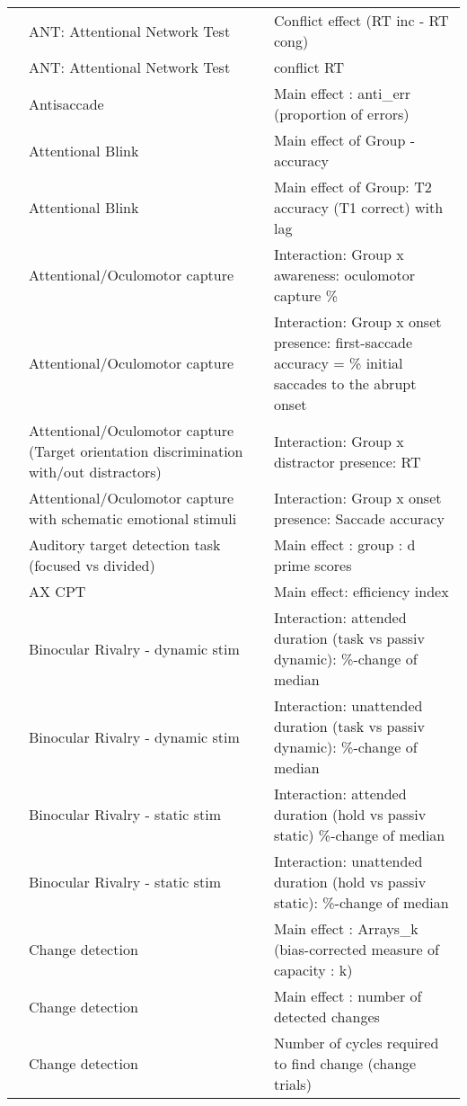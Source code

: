 \documentclass[
]{book}
\begin{document}
\begin{tabular}{l|l|l}
\cline{1-3}
 & ANT: Attentional Network Test & Conflict effect (RT inc - RT cong)\\
\cline{2-3}
 & ANT: Attentional Network Test & conflict RT\\
\cline{2-3}
 & Antisaccade & Main effect : anti\_err (proportion of errors)\\
\cline{2-3}
 & Attentional Blink & Main effect of Group - accuracy\\
\cline{2-3}
 & Attentional Blink & Main effect of Group:  T2 accuracy (T1 correct) with lag\\
\cline{2-3}
 & Attentional/Oculomotor capture & Interaction: Group x awareness: oculomotor capture \%\\
\cline{2-3}
 & Attentional/Oculomotor capture & Interaction: Group x onset presence: first-saccade accuracy = \% initial saccades to the abrupt onset\\
\cline{2-3}
 & Attentional/Oculomotor capture (Target orientation discrimination with/out distractors) & Interaction: Group x distractor presence: RT\\
\cline{2-3}
 & Attentional/Oculomotor capture with schematic emotional stimuli & Interaction: Group x onset presence: Saccade accuracy\\
\cline{2-3}
 & Auditory target detection task (focused vs divided) & Main effect : group : d prime scores\\
\cline{2-3}
 & AX CPT & Main effect: efficiency index\\
\cline{2-3}
 & Binocular Rivalry - dynamic stim & Interaction: attended duration (task vs passiv dynamic): \%-change of median\\
\cline{2-3}
 & Binocular Rivalry - dynamic stim & Interaction: unattended duration (task vs passiv dynamic): \%-change of median\\
\cline{2-3}
 & Binocular Rivalry - static stim & Interaction: attended duration (hold vs passiv static) \%-change of median\\
\cline{2-3}
 & Binocular Rivalry - static stim & Interaction: unattended duration (hold vs passiv static): \%-change of median\\
\cline{2-3}
 & Change detection & Main effect : Arrays\_k (bias-corrected measure of capacity : k)\\
\cline{2-3}
 & Change detection & Main effect : number of detected changes\\
\cline{2-3}
 & Change detection & Number of cycles required to find change (change trials)\\

\end{tabular}
\end{document}
